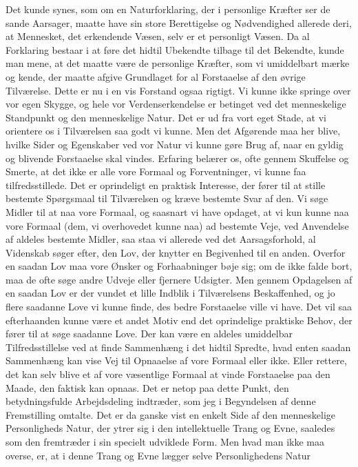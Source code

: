 \documentclass[12pt,a4paper]{article}
\newcommand{\opage}[1]{\marginnote{\footnotesize\textit{[#1]}}}
\begin{document}
Det kunde synes, som om en Naturforklaring, der i personlige Kræfter ser de
sande Aarsager, maatte have sin store Berettigelse og Nødvendighed allerede
deri, at \opage{22} Mennesket, det erkendende Væsen, selv er et personligt Væsen. Da al
Forklaring bestaar i at føre det hidtil Ubekendte tilbage til det Bekendte,
kunde man mene, at det maatte være de personlige Kræfter, som vi umiddelbart
mærke og kende, der maatte afgive Grundlaget for al Forstaaelse af den
øvrige Tilværelse. Dette er nu i en vis Forstand ogsaa rigtigt. Vi kunne
ikke springe over vor egen Skygge, og hele vor Verdenserkendelse er betinget
ved det menneskelige Standpunkt og den menneskelige Natur. Det er ud fra
vort eget Stade, at vi orientere os i Tilværelsen saa godt vi kunne. Men det
Afgørende maa her blive, hvilke Sider og Egenskaber ved vor Natur vi kunne
gøre Brug af, naar en gyldig og blivende Forstaaelse skal vindes. Erfaring
belærer os, ofte gennem Skuffelse og Smerte, at det ikke er alle vore
Formaal og Forventninger, vi kunne faa tilfredsstillede. Det er oprindeligt
en praktisk Interesse, der fører til at stille bestemte Spørgsmaal til
Tilværelsen og kræve bestemte Svar af den. Vi søge Midler til at naa vore
Formaal, og saasnart vi have opdaget, at vi kun kunne naa vore Formaal (dem,
vi overhovedet kunne naa) ad bestemte Veje, ved Anvendelse af aldeles
bestemte Midler, saa staa vi allerede ved det Aarsagsforhold, al Videnskab
søger efter, den Lov, der knytter en Begivenhed til en anden. Overfor en
saadan Lov maa vore Ønsker og Forhaabninger bøje sig; om de ikke falde bort,
maa de ofte søge andre Udveje eller fjernere Udsigter. Men gennem
Opdagelsen af en saadan Lov er der vundet et lille Indblik i Tilværelsens
Beskaffenhed, og jo flere saadanne Love vi kunne finde, des bedre
Forstaaelse ville vi have. Det vil saa efterhaanden kunne være et andet
Motiv end det oprindelige praktiske Behov, der fører til at søge saadanne
Love. Der kan være en aldeles umiddelbar Tilfredsstillelse ved at finde
Sammenhæng i det hidtil Spredte, hvad enten saadan Sammenhæng kan vise Vej
til Opnaaelse af vore Formaal \opage{23} eller ikke. Eller rettere, det kan selv blive
et af vore væsentlige Formaal at vinde Forstaaelse paa den Maade, den
faktisk kan opnaas. Det er netop paa dette Punkt, den betydningsfulde
Arbejdsdeling indtræder, som jeg i Begyndelsen af denne Fremstilling
omtalte. Det er da ganske vist en enkelt Side af den menneskelige
Personligheds Natur, der ytrer sig i den intellektuelle Trang og Evne,
saaledes som den fremtræder i sin specielt udviklede Form. Men hvad man ikke
maa overse, er, at i denne Trang og Evne lægger selve Personlighedens Natur
\end{document}
